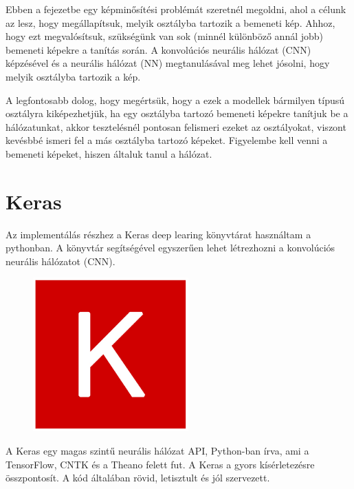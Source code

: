 



Ebben a fejezetbe egy képminősítési problémát szeretnél megoldni, ahol a célunk az lesz, hogy megállapítsuk, melyik osztályba tartozik a bemeneti kép. Ahhoz, hogy ezt megvalósítsuk, szükségünk van sok (minnél különböző annál jobb) bemeneti képekre a tanítás során. A konvolúciós neurális hálózat (CNN) képzésével és a neurális hálózat (NN) megtanulásával meg lehet jósolni, hogy melyik osztályba tartozik a kép.

A legfontosabb dolog, hogy megértsük, hogy a ezek a modellek bármilyen típusú osztályra kiképezhetjük, ha egy osztályba tartozó bemeneti képekre tanítjuk be a hálózatunkat, akkor tesztelésnél pontosan felismeri ezeket az osztályokat, viszont kevésbbé ismeri fel a más osztályba tartozó képeket. Figyelembe kell venni a bemeneti képeket, hiszen általuk tanul a hálózat.

\section{Keras}

Az implementálás részhez a Keras deep learing könyvtárat használtam a pythonban. A könyvtár segítségével egyszerűen lehet létrezhozni a konvolúciós neurális hálózatot (CNN).

\begin{figure}[h]
\centering
\includegraphics[scale=0.5]{images/keras}
\end{figure}

A Keras egy magas szintű neurális hálózat API, Python-ban írva, ami a TensorFlow, CNTK és a Theano felett fut. A Keras a gyors kísérletezésre összpontosít. A kód általában rövid, letisztult és jól szervezett.

